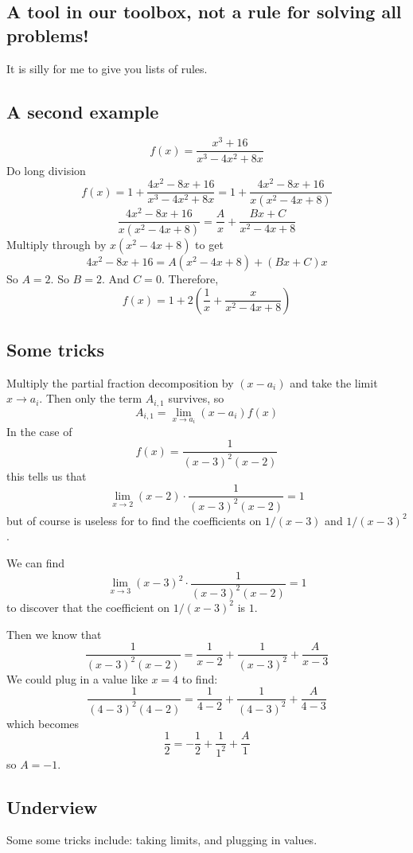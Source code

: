 \documentclass[12pt]{article}
\begin{document}
\subsection*{A tool in our toolbox, not a rule for solving all problems!}

It is silly for me to give you lists of rules.

\subsection*{A second example}

$$
f(x)=\frac{x^3+16}{x^3-4x^2+8x}
$$
Do long division
$$
f(x)=1+\frac{4x^2-8x+16}{x^3-4x^2+8x}=1+\frac{4x^2-8x+16}{x(x^2-4x+8)}
$$
$$
\frac{4x^2-8x+16}{x(x^2-4x+8)}=\frac{A}{x}+\frac{Bx+C}{x^2-4x+8}
$$
Multiply through by $x(x^2-4x+8)$ to get
$$
4x^2 - 8x + 16 = A (x^2 - 4x + 8) + (Bx + C)x
$$
So $A = 2$.  So $B = 2$.  And $C = 0$.  Therefore,
$$
f(x)=1+2\left(\frac{1}{x}+\frac{x}{x^2-4x+8}\right)
$$

\subsection*{Some tricks}

Multiply the partial fraction decomposition by $(x - a_i)$ and take the limit $x \to a_i$.  Then only the term $A_{i,1}$ survives, so
$$
A_{i,1} = \lim_{x \to a_i} (x - a_i) f(x)
$$
In the case of
$$
f(x) = \frac{1}{(x-3)^2 (x-2)}
$$
this tells us that 
$$
\lim_{x \to 2} (x-2) \cdot \frac{1}{(x-3)^2 (x-2)} = 1
$$
but of course is useless for to find the coefficients on $1/(x-3)$ and $1/(x-3)^2$.

We can find
$$
\lim_{x \to 3} (x-3)^2 \cdot \frac{1}{(x-3)^2 (x-2)} = 1
$$
to discover that the coefficient on $1/(x-3)^2$ is $1$.

Then we know that
$$
\frac{1}{(x-3)^2 (x-2)} = \frac{1}{x-2} + \frac{1}{(x-3)^2} + \frac{A}{x-3}
$$
We could plug in a value like $x = 4$ to find:
$$
\frac{1}{(4-3)^2 (4-2)} = \frac{1}{4-2} + \frac{1}{(4-3)^2} + \frac{A}{4-3}
$$
which becomes
$$
\frac{1}{2} = - \frac{1}{2} + \frac{1}{1^2} + \frac{A}{1}
$$
so $A = -1$.

\subsection*{Underview}

Some some tricks include: taking limits, and plugging in values.
\end{document}
